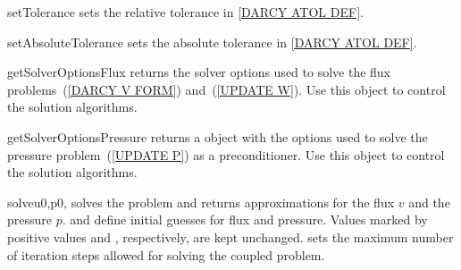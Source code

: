 \begin{methoddesc}[DarcyFlow]{setTolerance}{}
sets the relative tolerance  in \ref{DARCY ATOL DEF}.
\end{methoddesc}

\begin{methoddesc}[DarcyFlow]{setAbsoluteTolerance}{}
sets the absolute tolerance  in \ref{DARCY ATOL DEF}.
\end{methoddesc}

\begin{methoddesc}[DarcyFlow]{getSolverOptionsFlux}{}
returns the solver options used to solve the flux problems~(\ref{DARCY V FORM}) and~(\ref{UPDATE W}).
Use this \SolverOptions object to control the solution algorithms.
\end{methoddesc}

\begin{methoddesc}[DarcyFlow]{getSolverOptionsPressure}{}
returns a \SolverOptions object with the options used to solve the pressure
problem~(\ref{UPDATE P}) as a preconditioner.
Use this object to control the solution algorithms.
\end{methoddesc}

\begin{methoddesc}[DarcyFlow]{solve}{u0,p0, }
solves the problem and returns approximations for the flux $v$ and the pressure $p$.
 and  define initial guesses for flux and pressure.
Values marked by positive values  and
, respectively, are kept unchanged.
 sets the maximum number of iteration steps allowed for solving
the coupled problem.
\end{methoddesc}


